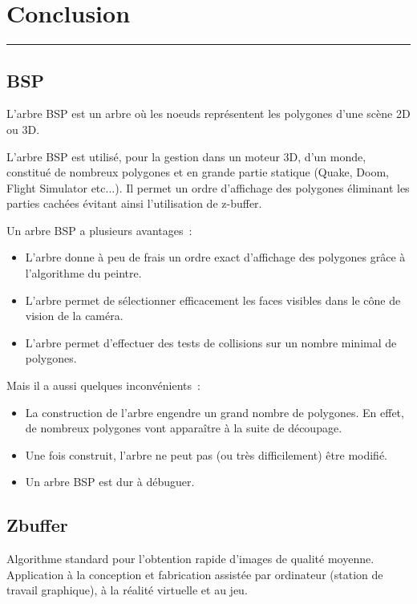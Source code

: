 \documentclass[a4paper,11pt]{amsart}
\begin{document}
\section{Conclusion}
\hrule\vspace{0.5cm}
\subsection{BSP}
L'arbre BSP est un arbre  o\`u les noeuds repr\'esentent les 
polygones d'une sc\`ene 2D ou 3D.

L'arbre BSP est utilis\'e, pour la gestion dans un 
moteur 3D, d'un monde, constitu\'e de nombreux polygones et en 
grande partie statique (Quake, Doom, Flight Simulator etc...).  
Il permet un ordre d'affichage des polygones \'eliminant les parties 
cach\'ees \'evitant ainsi l'utilisation de z-buffer.

Un arbre BSP a plusieurs avantages~:
\begin{itemize}
\item L'arbre donne \`a peu de frais un ordre exact d'affichage 
des polygones gr\^ace \`a l'algorithme du peintre.
\item L'arbre permet de s\'electionner efficacement les faces visibles dans 
le c\^one de vision de la cam\'era.
\item L'arbre permet d'effectuer des tests de collisions sur un nombre 
minimal de polygones.
\end{itemize}

Mais il a aussi quelques inconv\'enients~:
\begin{itemize}
\item La construction de l'arbre engendre un grand nombre de 
polygones.  En effet, de nombreux polygones vont appara\^itre \`a la 
suite de d\'ecoupage. 
\item Une fois construit, l'arbre ne peut pas 
(ou tr\`es difficilement) \^etre modifi\'e. 
\item Un arbre BSP est dur \`a d\'ebuguer.
\end{itemize}


\subsection{Zbuffer}
Algorithme standard 
pour l'obtention rapide d'images de qualit\'e moyenne.  Application \`a la 
conception et fabrication assist\'ee par ordinateur (station de travail 
graphique), \`a la r\'ealit\'e virtuelle et au jeu.
\end{document}
